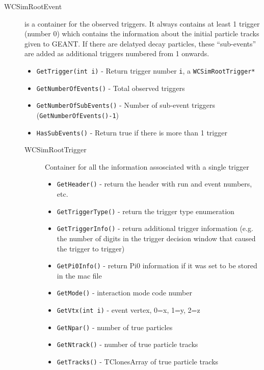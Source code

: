 \begin{description}
  \item[WCSimRootEvent] is a container for the observed triggers. It always contains at least 1 trigger (number 0) which contains the information about the initial particle tracks given to GEANT.  If there are delatyed decay particles, these ``sub-events'' are added as additional triggers numbered from 1 onwards.  
  \begin{itemize}
  \item \texttt{GetTrigger(int i)} - Return trigger number \texttt{i}, a \texttt{WCSimRootTrigger*}
  \item \texttt{GetNumberOfEvents()} - Total observed triggers
  \item \texttt{GetNumberOfSubEvents()} - Number of sub-event triggers (\texttt{GetNumberOfEvents()-1})
  \item \texttt{HasSubEvents()} - Return true if there is more than 1 trigger
  \end{itemize}

  \begin{description}
    \item[WCSimRootTrigger] Container for all the information assosciated with a single trigger
    \begin{itemize}
    \item \texttt{GetHeader()} - return the header with run and event numbers, etc.
    \item \texttt{GetTriggerType()} - return the trigger type enumeration
    \item \texttt{GetTriggerInfo()} - return additional trigger information (e.g. the number of digits in the trigger decision window that caused the trigger to trigger)
    \item \texttt{GetPi0Info()} - return Pi0 information if it was set to be stored in the mac file
    \item \texttt{GetMode()} - interaction mode code number
    \item \texttt{GetVtx(int i)} - event vertex, 0=x, 1=y, 2=z
    \item \texttt{GetNpar()} - number of true particles

    \item \texttt{GetNtrack()} - number of true particle tracks
    \item \texttt{GetTracks()} - TClonesArray of true particle tracks


\end{itemize}
\end{description}
\end{description}
